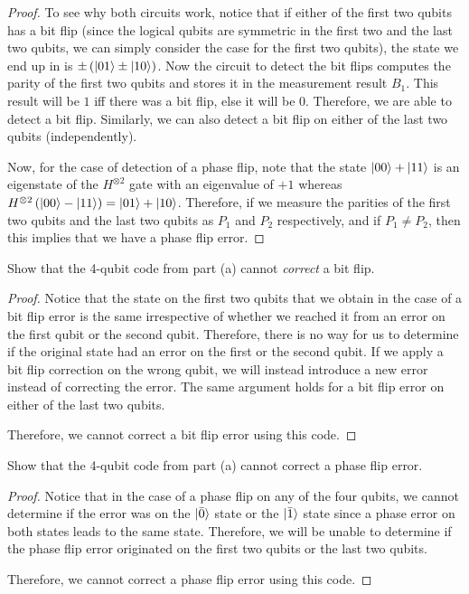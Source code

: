 \begin{solution}[label=ques:5a]
\begin{proof}[Proof]
    To see why both circuits work, notice that if either of the first two qubits has a bit flip (since the logical qubits are symmetric in the first two and the last two qubits, we can simply consider the case for the first two qubits), the state we end up in is $\pm\left(\ket{01} \pm \ket{10}\right)$. Now the circuit to detect the bit flips computes the parity of the first two qubits and stores it in the measurement result $B_1$. This result will be $1$ iff there was a bit flip, else it will be $0$. Therefore, we are able to detect a bit flip. Similarly, we can also detect a bit flip on either of the last two qubits (independently).\par
    Now, for the case of detection of a phase flip, note that the state $\ket{00} + \ket{11}$ is an eigenstate of the $H^{\otimes 2}$ gate with an eigenvalue of $+1$ whereas $H^{\otimes 2}\left(\ket{00} - \ket{11}\right) = \ket{01} + \ket{10}$. Therefore, if we measure the parities of the first two qubits and the last two qubits as $P_1$ and $P_2$ respectively, and if $P_1 \neq P_2$, then this implies that we have a phase flip error.
  \end{proof}
\end{solution}

\begin{solution}[label=ques:5b]
  \begin{question}
    Show that the 4-qubit code from part (a) cannot \emph{correct} a bit flip.
  \end{question}
  \tcblower{}
  \begin{proof}[Proof]
    Notice that the state on the first two qubits that we obtain in the case of a bit flip error is the same irrespective of whether we reached it from an error on the first qubit or the second qubit. Therefore, there is no way for us to determine if the original state had an error on the first or the second qubit. If we apply a bit flip correction on the wrong qubit, we will instead introduce a new error instead of correcting the error. The same argument holds for a bit flip error on either of the last two qubits.\par
    Therefore, we cannot correct a bit flip error using this code.
  \end{proof}
\end{solution}

\begin{solution}[label=ques:5c]
  \begin{question}
    Show that the 4-qubit code from part (a) cannot correct a phase flip error.
  \end{question}
  \tcblower{}
  \begin{proof}[Proof]
    Notice that in the case of a phase flip on any of the four qubits, we cannot determine if the error was on the $\ket{\bar{0}}$ state or the $\ket{\bar{1}}$ state since a phase error on both states leads to the same state. Therefore, we will be unable to determine if the phase flip error originated on the first two qubits or the last two qubits.\par
    Therefore, we cannot correct a phase flip error using this code.
  \end{proof}
\end{solution}
